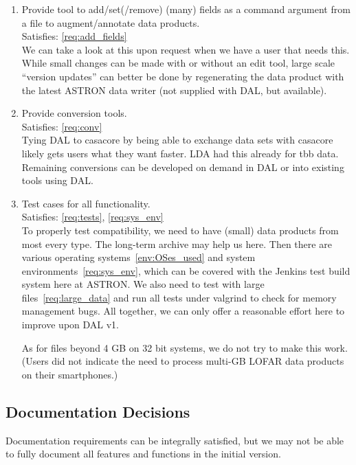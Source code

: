 \documentclass[a4paper,11pt]{article}
\begin{document}
\begin{enumerate}[resume, label=\it D.\arabic{*}]
\item \label{dsg:add_fields} Provide tool to add/set(/remove) (many) fields as a command argument from a file to augment/annotate data products.\\
Satisfies: \ref{req:add_fields}\\
We can take a look at this upon request when we have a user that needs this.
While small changes can be made with or without an edit tool, large scale ``version updates'' can better be done by regenerating the data product with the latest ASTRON data writer (not supplied with DAL, but available).

\item \label{dsg:conv} Provide conversion tools.\\
Satisfies: \ref{req:conv}\\
Tying DAL to casacore by being able to exchange data sets with casacore likely gets users what they want faster.
LDA had this already for tbb data.
Remaining conversions can be developed on demand in DAL or into existing tools using DAL.

\item \label{dsg:tests} Test cases for all functionality.\\
Satisfies: \ref{req:tests}, \ref{req:sys_env}\\
To properly test compatibility, we need to have (small) data products from most every type.
The long-term archive may help us here.
Then there are various operating systems~\ref{env:OSes_used} and system environments~\ref{req:sys_env}, which can be covered with the Jenkins test build system here at ASTRON.
We also need to test with large files~\ref{req:large_data} and run all tests under valgrind to check for memory management bugs.
All together, we can only offer a reasonable effort here to improve upon DAL v1.

As for files beyond 4 GB on 32 bit systems, we do not try to make this work.
(Users did not indicate the need to process multi-GB LOFAR data products on their smartphones.)

\end{enumerate}


\subsection{Documentation Decisions} \label{sec:doc_decisions}
Documentation requirements can be integrally satisfied, but we may not be able to fully document all features and functions in the initial version.
\end{document}
